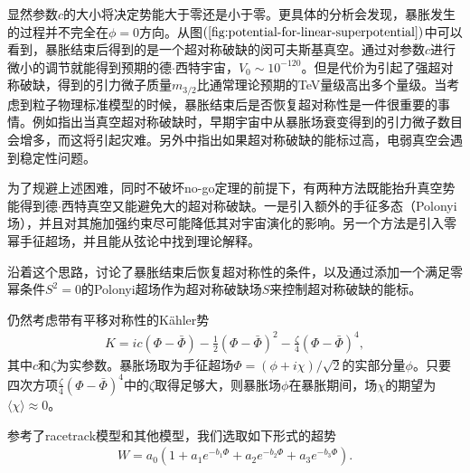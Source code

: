 显然参数$c$的大小将决定势能大于零还是小于零。更具体的分析会发现，暴胀发生的过程并不完全在$\phi=0$方向。从图$(\ref{fig:potential-for-linear-superpotential})$中可以
看到，暴胀结束后得到的是一个超对称破缺的闵可夫斯基真空。通过对参数$c$进行微小的调节就能得到预期的德$\cdot$西特宇宙，$V_0\sim
10^{-120}$。但是代价为引起了强超对称破缺，得到的引力微子质量$m_{3/2}$比通常理论预期的TeV量级高出多个量级。当考虑到粒子物理标准模型的时候，暴胀结束后是否恢复超对称性是一件很重要的事情。例如\citep{endo2006moduli,nakamura2006gravitino,kawasaki2006gravitino,kawasaki2006gravitino-overproduction,asaka2006gravitinos}指出当真空超对称破缺时，早期宇宙中从暴胀场衰变得到的引力微子数目会增多，而这将引起灾难。另外\citep{degrassi2012higgs}中指出如果超对称破缺的能标过高，电弱真空会遇到稳定性问题。

为了规避上述困难，同时不破坏no-go定理的前提下，有两种方法既能抬升真空势能得到德$\cdot$西特真空又能避免大的超对称破缺。一是引入额外的手征多态（Polonyi场），并且对其施加强约束尽可能降低其对宇宙演化的影响\citep{dudas2013strong}。另一个方法是引入零幂手征超场\citep{ferrara2014cosmology,kallosh2015inflation,dall2014sgoldstino,kallosh2015inflation-de-sitter,linde2015does}，并且能从弦论中找到理论解释\citep{kallosh2014emergence}。

沿着这个思路，\citep{ketov2016susy}讨论了暴胀结束后恢复超对称性的条件，以及通过添加一个满足零幂条件$S^2=0$的Polonyi超场作为超对称破缺场$S$来控制超对称破缺的能标。


仍然考虑带有平移对称性的K\"ahler势\citep{ketov2016susy}
\begin{align}
    K=ic(\Phi-\bar\Phi)-\frac{1}{2}{(\Phi-\bar\Phi)}^2-\frac{\zeta}{4}{(\Phi-\bar\Phi)}^4,
\end{align}
其中$c$和$\zeta$为实参数。暴胀场取为手征超场$\Phi=(\phi+i\chi)/\sqrt{2}$的实部分量$\phi$。只要四次方项$\frac{\zeta}{4}{(\Phi-\bar\Phi)}^4$中的$\zeta$取得足够大，则暴胀场$\phi$在暴胀期间，场$\chi$的期望为$\langle\chi\rangle\approx0$。

参考了racetrack模型\citep{krasnikov1987supersymmetry,escoda2003saltatory,blanco2005racetrack}和其他模型\citep{ketov2016susy}，我们选取如下形式的超势
\begin{align}
    W=a_0(1+a_1e^{-b_1\Phi}+a_2e^{-b_2\Phi}+a_3e^{-b_3\Phi}).
\end{align}


